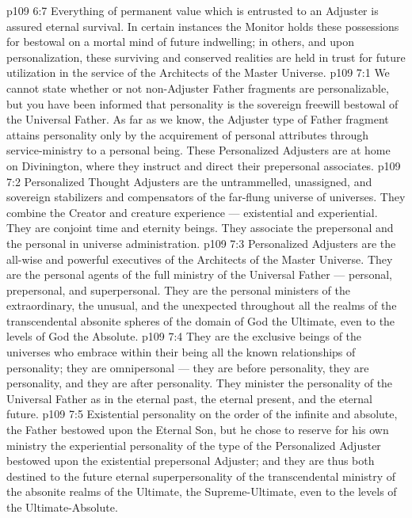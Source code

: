 \vs p109 6:7 Everything of permanent value which is entrusted to an Adjuster is assured eternal survival. In certain instances the Monitor holds these possessions for bestowal on a mortal mind of future indwelling; in others, and upon personalization, these surviving and conserved realities are held in trust for future utilization in the service of the Architects of the Master Universe.
\vs p109 7:1 We cannot state whether or not non\hyp{}Adjuster Father fragments are personalizable, but you have been informed that personality is the sovereign freewill bestowal of the Universal Father. As far as we know, the Adjuster type of Father fragment attains personality only by the acquirement of personal attributes through service\hyp{}ministry to a personal being. These Personalized Adjusters are at home on Divinington, where they instruct and direct their prepersonal associates.
\vs p109 7:2 Personalized Thought Adjusters are the untrammelled, unassigned, and sovereign stabilizers and compensators of the far\hyp{}flung universe of universes. They combine the Creator and creature experience --- existential and experiential. They are conjoint time and eternity beings. They associate the prepersonal and the personal in universe administration.
\vs p109 7:3 Personalized Adjusters are the all\hyp{}wise and powerful executives of the Architects of the Master Universe. They are the personal agents of the full ministry of the Universal Father --- personal, prepersonal, and superpersonal. They are the personal ministers of the extraordinary, the unusual, and the unexpected throughout all the realms of the transcendental absonite spheres of the domain of God the Ultimate, even to the levels of God the Absolute.
\vs p109 7:4 They are the exclusive beings of the universes who embrace within their being all the known relationships of personality; they are omnipersonal --- they are before personality, they are personality, and they are after personality. They minister the personality of the Universal Father as in the eternal past, the eternal present, and the eternal future.
\vs p109 7:5 Existential personality on the order of the infinite and absolute, the Father bestowed upon the Eternal Son, but he chose to reserve for his own ministry the experiential personality of the type of the Personalized Adjuster bestowed upon the existential prepersonal Adjuster; and they are thus both destined to the future eternal superpersonality of the transcendental ministry of the absonite realms of the Ultimate, the Supreme\hyp{}Ultimate, even to the levels of the Ultimate\hyp{}Absolute.
